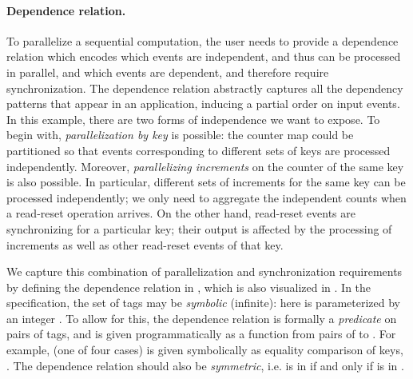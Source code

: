 \paragraph{Dependence relation.}
%
To parallelize a sequential computation, the user needs to provide a
dependence relation which encodes which events are independent, and
thus can be processed in parallel, and which events are dependent, and
therefore require synchronization.  The dependence relation abstractly
captures all the dependency patterns that appear in an application,
inducing a partial order on input events. In this example, there are
two forms of independence we want to expose. To begin with,
\emph{parallelization by key} is possible: the counter map could be
partitioned so that events corresponding to different sets of keys are processed
independently. Moreover, \emph{parallelizing increments} on the
counter of the same key is also possible. In particular, different
sets of increments for the same key can be processed independently; we
only need to aggregate the independent counts when a read-reset
operation arrives. On the other hand, read-reset events
are synchronizing for a particular key;
their output is affected by the processing of increments
as well as other read-reset events of that key.


We capture this combination of parallelization and synchronization
requirements by defining the dependence relation
 in , which is
also visualized in .
In the specification, the set of tags may be \emph{symbolic}
(infinite): here  is parameterized by an integer .
To allow for this, the dependence relation
is formally a \emph{predicate} on pairs of tags,
and is given programmatically as a function from pairs
of  to .
For example,  (one of four cases)
is given symbolically as equality comparison of keys, .
The dependence relation should also be \emph{symmetric},
i.e.  is in  if and
only if  is in .

